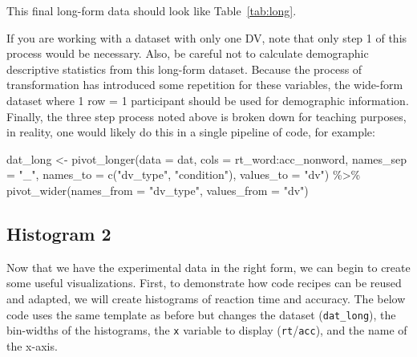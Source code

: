 \documentclass[
  english,
  doc,floatsintext]{apa6}
\newenvironment{Shaded}{\begin{snugshade}}{\end{snugshade}}
\newcommand{\AttributeTok}[1]{\textcolor[rgb]{0.77,0.63,0.00}{#1}}
\newcommand{\FunctionTok}[1]{\textcolor[rgb]{0.00,0.00,0.00}{#1}}
\newcommand{\NormalTok}[1]{#1}
\newcommand{\OtherTok}[1]{\textcolor[rgb]{0.56,0.35,0.01}{#1}}
\newcommand{\SpecialCharTok}[1]{\textcolor[rgb]{0.00,0.00,0.00}{#1}}
\newcommand{\StringTok}[1]{\textcolor[rgb]{0.31,0.60,0.02}{#1}}
\begin{document}
This final long-form data should look like Table~\ref{tab:long}.

If you are working with a dataset with only one DV, note that only step 1 of this process would be necessary. Also, be careful not to calculate demographic descriptive statistics from this long-form dataset. Because the process of transformation has introduced some repetition for these variables, the wide-form dataset where 1 row = 1 participant should be used for demographic information. Finally, the three step process noted above is broken down for teaching purposes, in reality, one would likely do this in a single pipeline of code, for example:

\begin{Shaded}
\begin{Highlighting}[]
\NormalTok{dat\_long }\OtherTok{\textless{}{-}} \FunctionTok{pivot\_longer}\NormalTok{(}\AttributeTok{data =}\NormalTok{ dat, }
                     \AttributeTok{cols =}\NormalTok{ rt\_word}\SpecialCharTok{:}\NormalTok{acc\_nonword, }
                     \AttributeTok{names\_sep =} \StringTok{"\_"}\NormalTok{, }
                     \AttributeTok{names\_to =} \FunctionTok{c}\NormalTok{(}\StringTok{"dv\_type"}\NormalTok{, }\StringTok{"condition"}\NormalTok{),}
                     \AttributeTok{values\_to =} \StringTok{"dv"}\NormalTok{) }\SpecialCharTok{\%\textgreater{}\%}
  \FunctionTok{pivot\_wider}\NormalTok{(}\AttributeTok{names\_from =} \StringTok{"dv\_type"}\NormalTok{, }
              \AttributeTok{values\_from =} \StringTok{"dv"}\NormalTok{)}
\end{Highlighting}
\end{Shaded}

\hypertarget{histogram-2}{%
\subsection{Histogram 2}\label{histogram-2}}

Now that we have the experimental data in the right form, we can begin to create some useful visualizations. First, to demonstrate how code recipes can be reused and adapted, we will create histograms of reaction time and accuracy. The below code uses the same template as before but changes the dataset (\texttt{dat\_long}), the bin-widths of the histograms, the \texttt{x} variable to display (\texttt{rt}/\texttt{acc}), and the name of the x-axis.
\end{document}
